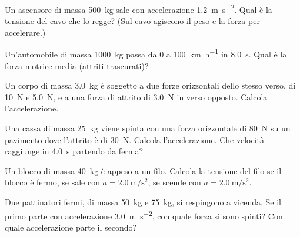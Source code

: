 \begin{esercizio}
Un ascensore di massa \SI{500}{\kilo\gram} sale con accelerazione \SI{1,2}{\metre\per\second\squared}. Qual è la tensione del cavo che lo regge? (Sul cavo agiscono il peso e la forza per accelerare.)\\
\end{esercizio}

\begin{esercizio}
Un'automobile di massa \SI{1000}{\kilo\gram} passa da \SI{0}{} a \SI{100}{\kilo\metre\per\hour} in \SI{8,0}{\second}. Qual è la forza motrice media (attriti trascurati)?\\
\end{esercizio}

\begin{esercizio}
Un corpo di massa \SI{3,0}{\kilo\gram} è soggetto a due forze orizzontali dello stesso verso, di \SI{10}{\newton} e \SI{5,0}{\newton}, e a una forza di attrito di \SI{3,0}{\newton} in verso opposto. Calcola l'accelerazione.\\
\end{esercizio}

\begin{esercizio}
Una cassa di massa \SI{25}{\kilo\gram} viene spinta con una forza orizzontale di \SI{80}{\newton} su un pavimento dove l'attrito è di \SI{30}{\newton}. Calcola l'accelerazione. Che velocità raggiunge in \SI{4,0}{\second} partendo da ferma?\\
\end{esercizio}

\begin{esercizio}
Un blocco di massa \SI{40}{\kilo\gram} è appeso a un filo. Calcola la tensione del filo se il blocco è fermo, se sale con $a = \SI{2,0}{\metre\per\second\squared}$, se scende con $a = \SI{2,0}{\metre\per\second\squared}$.\\
\end{esercizio}

\begin{esercizio}
Due pattinatori fermi, di massa \SI{50}{\kilo\gram} e \SI{75}{\kilo\gram}, si respingono a vicenda. Se il primo parte con accelerazione \SI{3,0}{\metre\per\second\squared}, con quale forza si sono spinti? Con quale accelerazione parte il secondo?\\
\end{esercizio}

